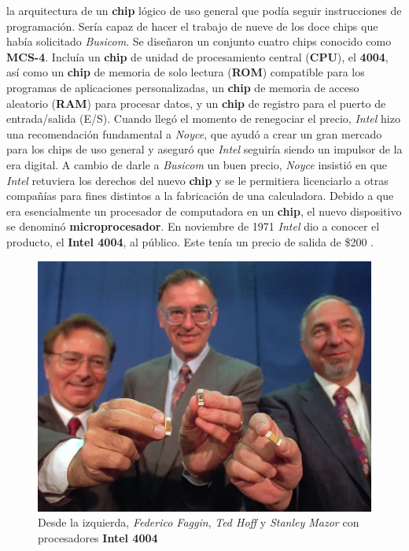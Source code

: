 la arquitectura de un \textbf{chip} lógico de uso general que podía seguir instrucciones de programación. Sería capaz de hacer el trabajo de
nueve de los doce chips que había solicitado \emph{Busicom}. Se diseñaron un conjunto cuatro chips conocido como \textbf{MCS-4}. Incluía un
\textbf{chip} de unidad de procesamiento central (\textbf{CPU}), el \textbf{4004}, así como un \textbf{chip} de memoria de solo lectura
(\textbf{ROM}) compatible para los programas de aplicaciones personalizadas, un \textbf{chip} de memoria de acceso aleatorio (\textbf{RAM})
para procesar datos, y un \textbf{chip} de registro para el puerto de entrada/salida (E/S). Cuando llegó el momento de renegociar el precio,
\emph{Intel} hizo una recomendación fundamental a \emph{Noyce}, que ayudó a crear un gran mercado para los chips de uso general y aseguró que
\emph{Intel} seguiría siendo un impulsor de la era digital. A cambio de darle a \emph{Busicom} un buen precio, \emph{Noyce} insistió en que
\emph{Intel} retuviera los derechos del nuevo \textbf{chip} y se le permitiera licenciarlo a otras compañías para fines distintos a la
fabricación de una calculadora. Debido a que era esencialmente un procesador de computadora en un \textbf{chip}, el nuevo dispositivo se
denominó \textbf{microprocesador}. En noviembre de 1971 \emph{Intel} dio a conocer el producto, el \textbf{Intel 4004}, al público.
Este tenía un precio de salida de \$200 .

\begin{figure}[htb]
	\centering
	\includegraphics[scale = 0.25]{Graphics/faggin_hoff_mazor_-4004.jpg}
	\caption{Desde la izquierda, \emph{Federico Faggin}, \emph{Ted Hoff} y \emph{Stanley Mazor} con procesadores \textbf{Intel 4004}}
	\label{fig:10}
\end{figure}

